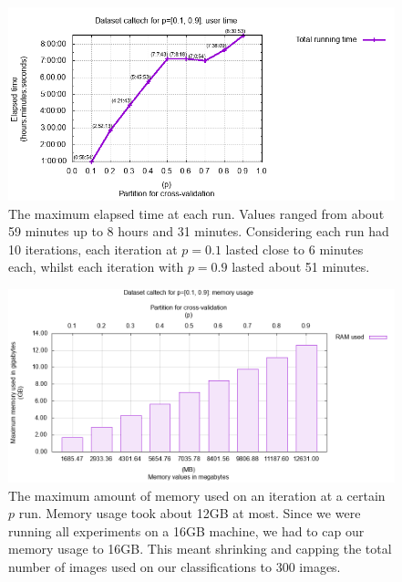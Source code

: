 \documentclass{amsart}
\theoremstyle{plain}
\numberwithin{equation}{section}
\begin{document}
\begin{figure}[p]
  \centering\includegraphics[scale=0.6]{imgs/caltech_time.png}
  \captionsetup{singlelinecheck=false,justification=justified,margin=0cm}
  \caption{The maximum elapsed time at each run. Values ranged from about 59 minutes up to 8 hours
  and 31 minutes. Considering each run had 10 iterations, each iteration at $p=0.1$ lasted close to
  6 minutes each, whilst each iteration with $p=0.9$ lasted about 51
  minutes.}\label{fig:caltech-time}
\end{figure}

\begin{figure}[t]
  \centering\includegraphics[scale=0.5]{imgs/caltech_mem.png}
  \captionsetup{singlelinecheck=false,justification=justified,margin=0cm}
  \caption{The maximum amount of memory used on an iteration at a certain $p$ run. Memory usage
  took about 12GB at most. Since we were running all experiments on a 16GB machine, we had to cap
  our memory usage to 16GB\@. This meant shrinking and capping the total number of images used on
  our classifications to 300 images.}\label{fig:caltech-mem}
\end{figure}
\end{document}
